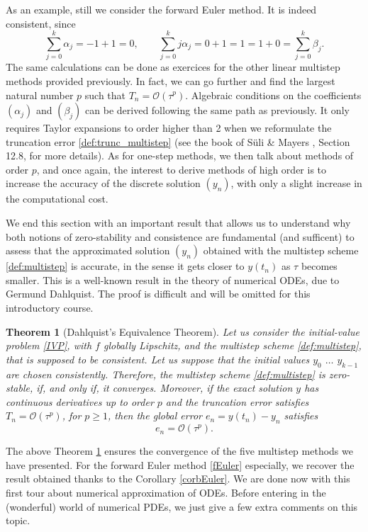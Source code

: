 \documentclass{article}
\newtheorem{theorem}{Theorem}
\begin{document}
As an example, still we consider the forward Euler method. It is indeed consistent, since
\[
\sum_{j=0}^k \alpha_j = -1 + 1 = 0, 
\qquad \sum_{j=0}^k j \alpha_j  = 0 + 1 = 1 = 1 + 0 = \sum_{j=0}^k \beta_j.
\]
The same calculations can be done as exercices for the other linear multistep methods provided previously. In fact, we can go further and find the largest natural number $p$ such that $T_n = \mathcal{O}(\tau^p)$. Algebraic conditions on the coefficients $(\alpha_j)$ and $(\beta_j)$ can be derived following the same path as previously. It only requires Taylor expansions to order higher than 2 when we reformulate the truncation error \eqref{def:trunc_multistep} (see the book of S\"uli \& Mayers \cite{suli03}, Section 12.8, for more details). As for one-step methods, we then talk about methods of order $p$, and once again, the interest to derive methods of high order is to increase the accuracy of the discrete solution $(y_n)$, with only a slight increase in the computational cost.

We end this section with an important result that allows us to understand why both notions of zero-stability and consistence are fundamental (and sufficent) to assess that the approximated solution $(y_n)$ obtained with the multistep scheme \eqref{def:multistep} is accurate, in the sense it gets closer to $y(t_n)$ as $\tau$ becomes smaller. This is a well-known result in the theory of numerical ODEs, due to Germund Dahlquist. The proof is difficult and will be omitted for this introductory course.

\begin{theorem}[Dahlquist's Equivalence Theorem] \label{thm:Dahlquist1}
Let us consider the ini\-tial-value problem \eqref{IVP}, with $f$ globally Lipschitz, and the multistep scheme \eqref{def:multistep}, that is supposed to be consistent. Let us suppose that the initial values $y_0$ $\ldots$ $y_{k-1}$ are chosen consistently. Therefore, the multistep scheme \eqref{def:multistep} is zero-stable, if, and only if, it converges. Moreover, if the exact solution $y$ has continuous derivatives up to order $p$ and the truncation error satisfies $T_n=\mathcal{O}(\tau^p)$, for $p\geq1$, then the global error $e_n = y(t_n) - y_n$ satisfies
\[
e_n = \mathcal{O} ( \tau^p).
\]
\end{theorem}

The above Theorem \ref{thm:Dahlquist1} ensures the convergence of the five multistep methods we have presented. For the forward Euler method \eqref{fEuler} especially, we recover the result obtained thanks to the Corollary \ref{corbEuler}.
%
We are done now with this first tour about numerical approximation of ODEs. Before entering in the (wonderful) world of numerical PDEs, we just give a few extra comments on this topic.
\end{document}
